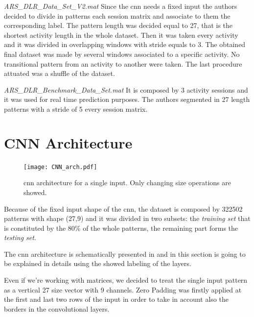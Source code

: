 \begin{LaTeXdescription}
	\item[\textit{ARS\_DLR\_Data\_Set\_V2.mat}]
		Since the \gls{cnn} needs a fixed input the authors decided to divide in patterns each session matrix and associate to them the corresponding label. The pattern length was decided equal to 27, that is the shortest activity length in the whole dataset. 
		Then it was taken every activity and it was divided in overlapping windows with stride equals to 3. The obtained final dataset was made by several windows associated to a specific activity. No transitional pattern from an activity to another were taken.
		The last procedure attuated was a shuffle of the dataset.

	\item[\textit{ARS\_DLR\_Benchmark\_Data\_Set.mat}]
		It is composed by 3 activity sessions and it was used for real time prediction purposes. The authors segmented in 27 length patterns with a stride of 5 every session matrix. 
\end{LaTeXdescription}




\section{CNN Architecture}
\label{sec:cnn_architecture}
\begin{figure}[htp]
\texttt{[image: CNN\_arch.pdf]}
\caption{\gls{cnn} architecture for a single input. Only changing size operations are showed.}
\label{fig:CNN}
\end{figure}


Because of the fixed input shape of the \gls{cnn}, the dataset  is composed by 322502 patterns with shape (27,9) and it was divided in two subsets: the \textit{training set} that is constituted by the 80\% of the whole patterns, the remaining part forms the \textit{testing set}.

The \gls{cnn} architecture is schematically presented in  and in this section is going to be explained in details using the showed labeling of the layers. 

Even if we're working with matrices, we decided to treat the single input pattern as a vertical 27 size vector with 9 channels. Zero Padding was firstly applied at the first and last two rows of the input in order to take in account also the borders in the convolutional layers.

